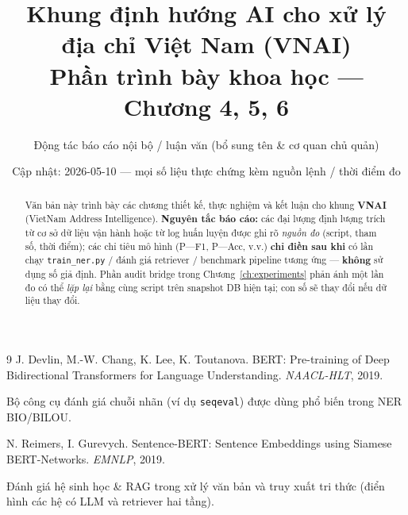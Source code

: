 \documentclass[12pt,a4paper]{report}
\title{Khung định hướng AI cho xử lý địa chỉ Việt Nam (VNAI)\\\large Phần trình bày khoa học — Chương 4, 5, 6}
\author{Động tác báo cáo nội bộ / luận văn (bổ sung tên \& cơ quan chủ quản)}
\date{Cập nhật: 2026-05-10 --- mọi số liệu thực chứng kèm nguồn lệnh / thời điểm đo}
\begin{document}
\maketitle

\begin{abstract}
Văn bản này trình bày các chương thiết kế, thực nghiệm và kết luận cho khung \textbf{VNAI} (VietNam Address Intelligence). \textbf{Nguyên tắc báo cáo:} các đại lượng định lượng trích từ cơ sở dữ liệu vận hành hoặc từ log huấn luyện được ghi rõ \emph{nguồn đo} (script, tham số, thời điểm); các chỉ tiêu mô hình (P---F1, P---Acc, v.v.) \textbf{chỉ điền sau khi} có lần chạy \texttt{train\_ner.py} / đánh giá retriever / benchmark pipeline tương ứng --- \textbf{không} sử dụng số giả định. Phần audit bridge trong Chương~\ref{ch:experiments} phản ánh một lần đo có thể \emph{lặp lại} bằng cùng script trên snapshot DB hiện tại; con số sẽ thay đổi nếu dữ liệu thay đổi.
\end{abstract}

\tableofcontents
\clearpage


\clearpage






\begin{thebibliography}{9}
J. Devlin, M.-W. Chang, K. Lee, K. Toutanova.
\newblock BERT: Pre-training of Deep Bidirectional Transformers for Language Understanding.
\newblock \emph{NAACL-HLT}, 2019.

Bộ công cụ đánh giá chuỗi nhãn (ví dụ \texttt{seqeval}) được dùng phổ biến trong NER BIO/BILOU.

N. Reimers, I. Gurevych.
\newblock Sentence-BERT: Sentence Embeddings using Siamese BERT-Networks.
\newblock \emph{EMNLP}, 2019.

Đánh giá hệ sinh học \& RAG trong xử lý văn bản và truy xuất tri thức (điển hình các hệ có LLM và retriever hai tầng).
\end{thebibliography}
\end{document}
